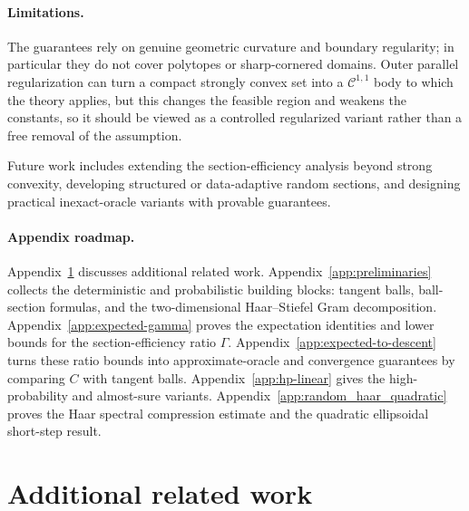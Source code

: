 \documentclass{article}
\begin{document}
\paragraph{Limitations.}
The guarantees rely on genuine geometric curvature and boundary regularity; in
particular they do not cover polytopes or sharp-cornered domains. Outer
parallel regularization can turn a compact strongly convex set into a
\(\mathcal C^{1,1}\) body to which the theory applies, but this changes the feasible
region and weakens the constants, so it should be viewed as a controlled
regularized variant rather than a free removal of the assumption.

Future work includes extending the section-efficiency analysis beyond strong convexity, developing structured or data-adaptive random sections,
and designing practical inexact-oracle variants with provable guarantees.





\appendix




\newpage 
\paragraph{Appendix roadmap.}
Appendix~\ref{app:related_work} discusses additional related work. Appendix~\ref{app:preliminaries} collects the deterministic and probabilistic
building blocks: tangent balls, ball-section formulas, and the two-dimensional
Haar--Stiefel Gram decomposition. Appendix~\ref{app:expected-gamma} proves the
expectation identities and lower bounds for the section-efficiency ratio
\(\Gamma\). Appendix~\ref{app:expected-to-descent} turns these ratio bounds into
approximate-oracle and convergence guarantees by comparing \(C\) with tangent
balls. Appendix~\ref{app:hp-linear} gives the high-probability and almost-sure
variants. Appendix~\ref{app:random_haar_quadratic} proves the Haar spectral
compression estimate and the quadratic ellipsoidal short-step result.
\section{Additional related work}
\label{app:related_work}
\end{document}
